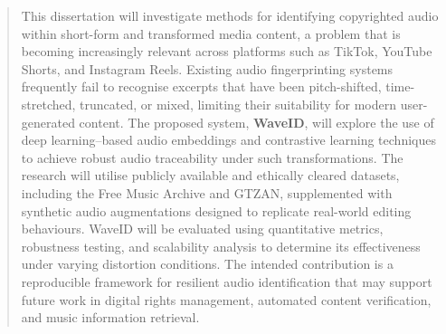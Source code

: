 \begin{abstract}
This dissertation will investigate methods for identifying copyrighted audio within short-form and transformed media content, a problem that is becoming increasingly relevant across platforms such as TikTok, YouTube Shorts, and Instagram Reels. Existing audio fingerprinting systems frequently fail to recognise excerpts that have been pitch-shifted, time-stretched, truncated, or mixed, limiting their suitability for modern user-generated content. The proposed system, \textbf{WaveID}, will explore the use of deep learning–based audio embeddings and contrastive learning techniques to achieve robust audio traceability under such transformations. The research will utilise publicly available and ethically cleared datasets, including the Free Music Archive and GTZAN, supplemented with synthetic audio augmentations designed to replicate real-world editing behaviours. WaveID will be evaluated using quantitative metrics, robustness testing, and scalability analysis to determine its effectiveness under varying distortion conditions. The intended contribution is a reproducible framework for resilient audio identification that may support future work in digital rights management, automated content verification, and music information retrieval.
\end{abstract}
